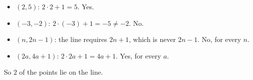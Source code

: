 \begin{itemize}
\item $(2,5)$: $2\cdot2+1=5$. Yes.
\item $(-3,-2)$: $2\cdot(-3)+1=-5\ne-2$. No.
\item $(n,2n-1)$: the line requires $2n+1$, which is never $2n-1$. No, for every $n$.
\item $(2a,4a+1)$: $2\cdot2a+1=4a+1$. Yes, for every $a$.
\end{itemize}
So $\boxed{2}$ of the points lie on the line.
